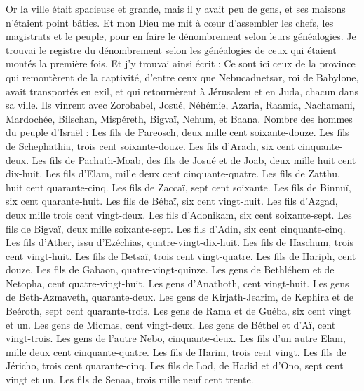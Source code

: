 \begin{multicols}{2}
Or la ville était spacieuse et grande, mais il y avait peu de gens, et ses maisons n'étaient point bâties.
Et mon Dieu me mit à cœur d'assembler les chefs, les magistrats et le peuple, pour en faire le dénombrement selon leurs généalogies. Je trouvai le registre du dénombrement selon les généalogies de ceux qui étaient montés la première fois. Et j'y trouvai ainsi écrit :
Ce sont ici ceux de la province qui remontèrent de la captivité, d'entre ceux que Nebucadnetsar, roi de Babylone, avait transportés en exil, et qui retournèrent à Jérusalem et en Juda, chacun dans sa ville.
Ils vinrent avec Zorobabel, Josué, Néhémie, Azaria, Raamia, Nachamani, Mardochée, Bilschan, Mispéreth, Bigvaï, Nehum, et Baana. Nombre des hommes du peuple d'Israël :
Les fils de Pareosch, deux mille cent soixante-douze.
Les fils de Schephathia, trois cent soixante-douze.
Les fils d'Arach, six cent cinquante-deux.
Les fils de Pachath-Moab, des fils de Josué et de Joab, deux mille huit cent dix-huit.
Les fils d'Elam, mille deux cent cinquante-quatre.
Les fils de Zatthu, huit cent quarante-cinq.
Les fils de Zaccaï, sept cent soixante.
Les fils de Binnuï, six cent quarante-huit.
Les fils de Bébaï, six cent vingt-huit.
Les fils d'Azgad, deux mille trois cent vingt-deux.
Les fils d'Adonikam, six cent soixante-sept.
Les fils de Bigvaï, deux mille soixante-sept.
Les fils d'Adin, six cent cinquante-cinq.
Les fils d'Ather, issu d'Ezéchias, quatre-vingt-dix-huit.
Les fils de Haschum, trois cent vingt-huit.
Les fils de Betsaï, trois cent vingt-quatre.
Les fils de Hariph, cent douze.
Les fils de Gabaon, quatre-vingt-quinze.
Les gens de Bethléhem et de Netopha, cent quatre-vingt-huit.
Les gens d'Anathoth, cent vingt-huit.
Les gens de Beth-Azmaveth, quarante-deux.
Les gens de Kirjath-Jearim, de Kephira et de Beéroth, sept cent quarante-trois.
Les gens de Rama et de Guéba, six cent vingt et un.
Les gens de Micmas, cent vingt-deux.
Les gens de Béthel et d'Aï, cent vingt-trois.
Les gens de l'autre Nebo, cinquante-deux.
Les fils d'un autre Elam, mille deux cent cinquante-quatre.
Les fils de Harim, trois cent vingt.
Les fils de Jéricho, trois cent quarante-cinq.
Les fils de Lod, de Hadid et d'Ono, sept cent vingt et un.
Les fils de Senaa, trois mille neuf cent trente.

\end{multicols}

